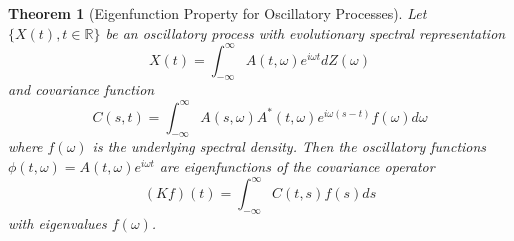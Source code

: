 \documentclass{article}
\newtheorem{theorem}{Theorem}
\begin{document}
\begin{theorem}
  [Eigenfunction Property for Oscillatory Processes] Let $\{X (t), t \in
  \mathbb{R}\}$ be an oscillatory process with evolutionary spectral
  representation
  \begin{equation}
    X (t) = \int_{- \infty}^{\infty} A (t, \omega) e^{i \omega t} dZ (\omega)
  \end{equation}
  and covariance function
  \begin{equation}
    C (s, t) = \int_{- \infty}^{\infty} A (s, \omega) A^{\ast} (t, \omega) e^{i \omega (s - t)} f
    (\omega) d \omega
  \end{equation}
  where $f (\omega)$ is the underlying spectral density. Then the oscillatory
  functions $\phi (t, \omega) = A (t, \omega) e^{i \omega t}$ are
  eigenfunctions of the covariance operator
  \begin{equation}
    (Kf) (t) = \int_{- \infty}^{\infty} C (t, s) f (s) ds
  \end{equation}
  with eigenvalues $f (\omega)$.
\end{theorem}
\end{document}
